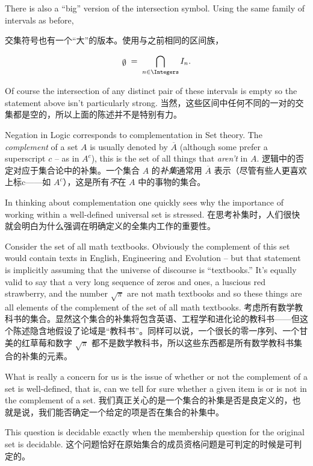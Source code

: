 There is also a ``big'' version of the intersection symbol.  Using 
the same family of intervals as before, 

交集符号也有一个“大”的版本。使用与之前相同的区间族，

\[ \mbox{\raisebox{-2pt}{$\emptyset$}} \; = \; \bigcap_{n\in\Integers} I_n. \]

Of course the intersection of any distinct pair of these intervals is empty
so the statement above isn't particularly strong.
当然，这些区间中任何不同的一对的交集都是空的，所以上面的陈述并不是特别有力。

Negation in Logic corresponds to 
complementation in Set theory.  The 
\emph{complement} of a set $A$ is usually denoted by $\overline{A}$ 
(although some prefer a superscript $c$ -- as in $A^c$), this is the set
of all things that \emph{aren't} in $A$.
逻辑中的否定对应于集合论中的补集。一个集合 $A$ 的\emph{补集}通常用 $\overline{A}$ 表示（尽管有些人更喜欢上标c——如 $A^c$），这是所有\emph{不}在 $A$ 中的事物的集合。

In thinking about complementation
one quickly sees why the importance of working within a well-defined
universal set is stressed.
在思考补集时，人们很快就会明白为什么强调在明确定义的全集内工作的重要性。

Consider the set of all math textbooks.
Obviously the complement of this set would contain texts in English,
Engineering and Evolution -- but that statement is implicitly 
assuming that the universe of discourse is ``textbooks.''   It's equally
valid to say that a very long sequence of zeros and ones, a luscious 
red strawberry, and the number $\sqrt{\pi}$ 
are not math textbooks and so
these things are all elements of the complement of the set of all math
textbooks.
考虑所有数学教科书的集合。显然这个集合的补集将包含英语、工程学和进化论的教科书——但这个陈述隐含地假设了论域是“教科书”。同样可以说，一个很长的零一序列、一个甘美的红草莓和数字 $\sqrt{\pi}$ 都不是数学教科书，所以这些东西都是所有数学教科书集合的补集的元素。

What is really a concern for us is the issue of whether or not
the complement of a set is well-defined, that is, can we tell for sure
whether a given item is or is not in the complement of a set.
我们真正关心的是一个集合的补集是否是良定义的，也就是说，我们能否确定一个给定的项是否在集合的补集中。

This 
question is decidable exactly when the membership question for the
original set is decidable.
这个问题恰好在原始集合的成员资格问题是可判定的时候是可判定的。

